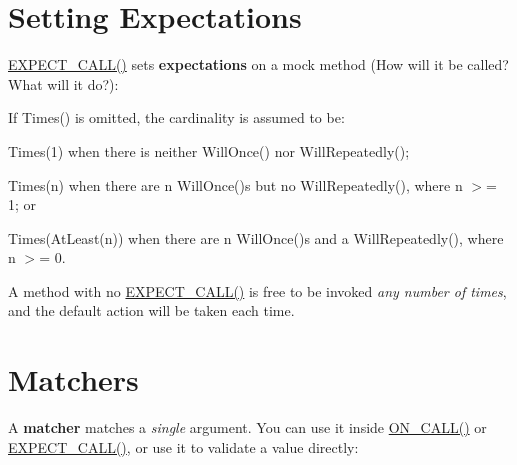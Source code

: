 \section*{Setting Expectations}

{\ttfamily \mbox{\hyperlink{gmock-spec-builders_8h_a535a6156de72c1a2e25a127e38ee5232}{E\+X\+P\+E\+C\+T\+\_\+\+C\+A\+L\+L()}}} sets {\bfseries{expectations}} on a mock method (How will it be called? What will it do?)\+: 
\begin{DoxyCode}{0}
\end{DoxyCode}


If {\ttfamily Times()} is omitted, the cardinality is assumed to be\+:


\begin{DoxyItemize}
\item {\ttfamily Times(1)} when there is neither {\ttfamily Will\+Once()} nor {\ttfamily Will\+Repeatedly()};
\item {\ttfamily Times(n)} when there are {\ttfamily n Will\+Once()}s but no {\ttfamily Will\+Repeatedly()}, where {\ttfamily n} $>$= 1; or
\item {\ttfamily Times(\+At\+Least(n))} when there are {\ttfamily n Will\+Once()}s and a {\ttfamily Will\+Repeatedly()}, where {\ttfamily n} $>$= 0.
\end{DoxyItemize}

A method with no {\ttfamily \mbox{\hyperlink{gmock-spec-builders_8h_a535a6156de72c1a2e25a127e38ee5232}{E\+X\+P\+E\+C\+T\+\_\+\+C\+A\+L\+L()}}} is free to be invoked {\itshape any number of times}, and the default action will be taken each time.

\section*{Matchers}

A {\bfseries{matcher}} matches a {\itshape single} argument. You can use it inside {\ttfamily \mbox{\hyperlink{gmock-spec-builders_8h_a5b12ae6cf84f0a544ca811b380c37334}{O\+N\+\_\+\+C\+A\+L\+L()}}} or {\ttfamily \mbox{\hyperlink{gmock-spec-builders_8h_a535a6156de72c1a2e25a127e38ee5232}{E\+X\+P\+E\+C\+T\+\_\+\+C\+A\+L\+L()}}}, or use it to validate a value directly\+:

